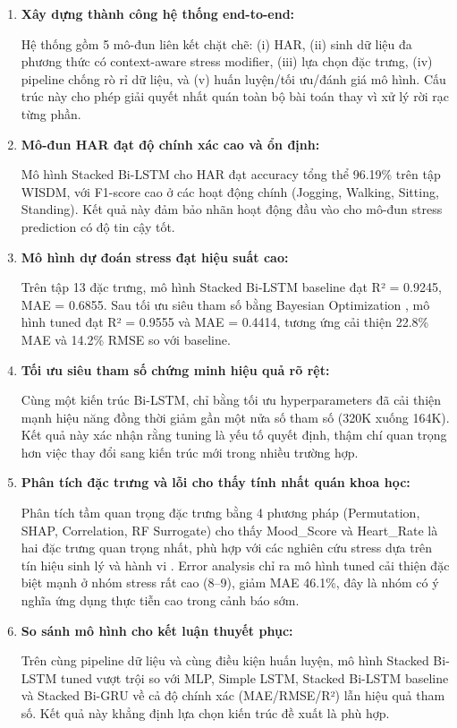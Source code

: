 \begin{enumerate}
    \item \textbf{Xây dựng thành công hệ thống end-to-end:}
    
    Hệ thống gồm 5 mô-đun liên kết chặt chẽ: (i) HAR, (ii) sinh dữ liệu đa phương thức có context-aware stress modifier, (iii) lựa chọn đặc trưng, (iv) pipeline chống rò rỉ dữ liệu, và (v) huấn luyện/tối ưu/đánh giá mô hình. Cấu trúc này cho phép giải quyết nhất quán toàn bộ bài toán thay vì xử lý rời rạc từng phần.

    \item \textbf{Mô-đun HAR đạt độ chính xác cao và ổn định:}
    
    Mô hình Stacked Bi-LSTM cho HAR đạt accuracy tổng thể 96.19\% trên tập WISDM, với F1-score cao ở các hoạt động chính (Jogging, Walking, Sitting, Standing). Kết quả này đảm bảo nhãn hoạt động đầu vào cho mô-đun stress prediction có độ tin cậy tốt.

    \item \textbf{Mô hình dự đoán stress đạt hiệu suất cao:}
    
    Trên tập 13 đặc trưng, mô hình Stacked Bi-LSTM baseline đạt R² = 0.9245, MAE = 0.6855. Sau tối ưu siêu tham số bằng Bayesian Optimization \cite{snoek2012practical}, mô hình tuned đạt R² = 0.9555 và MAE = 0.4414, tương ứng cải thiện 22.8\% MAE và 14.2\% RMSE so với baseline.

    \item \textbf{Tối ưu siêu tham số chứng minh hiệu quả rõ rệt:}
    
    Cùng một kiến trúc Bi-LSTM, chỉ bằng tối ưu hyperparameters đã cải thiện mạnh hiệu năng đồng thời giảm gần một nửa số tham số (320K xuống 164K). Kết quả này xác nhận rằng tuning là yếu tố quyết định, thậm chí quan trọng hơn việc thay đổi sang kiến trúc mới trong nhiều trường hợp.

    \item \textbf{Phân tích đặc trưng và lỗi cho thấy tính nhất quán khoa học:}
    
    Phân tích tầm quan trọng đặc trưng bằng 4 phương pháp (Permutation, SHAP, Correlation, RF Surrogate) cho thấy Mood\_Score và Heart\_Rate là hai đặc trưng quan trọng nhất, phù hợp với các nghiên cứu stress dựa trên tín hiệu sinh lý và hành vi \cite{hovsepian2015cstress, can2019stress}. Error analysis chỉ ra mô hình tuned cải thiện đặc biệt mạnh ở nhóm stress rất cao (8--9), giảm MAE 46.1\%, đây là nhóm có ý nghĩa ứng dụng thực tiễn cao trong cảnh báo sớm.

    \item \textbf{So sánh mô hình cho kết luận thuyết phục:}
    
    Trên cùng pipeline dữ liệu và cùng điều kiện huấn luyện, mô hình Stacked Bi-LSTM tuned vượt trội so với MLP, Simple LSTM, Stacked Bi-LSTM baseline và Stacked Bi-GRU về cả độ chính xác (MAE/RMSE/R²) lẫn hiệu quả tham số. Kết quả này khẳng định lựa chọn kiến trúc đề xuất là phù hợp.
\end{enumerate}

